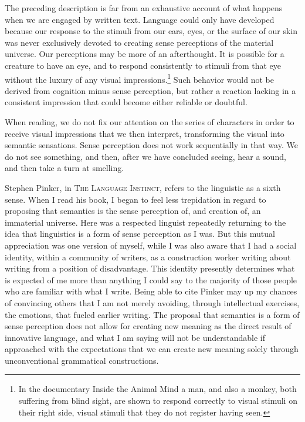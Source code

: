\documentclass[
]{memoir}
\begin{document}
The preceding description is far from an exhaustive account of what
happens when we are engaged by written text. Language could only have
developed because our response to the stimuli from our ears, eyes, or
the surface of our skin was never exclusively devoted to creating sense
perceptions of the material universe. Our perceptions may be more of an
afterthought. It is possible for a creature to have an eye, and to
respond consistently to stimuli from that eye without the luxury of any
visual impressions.\footnote{In the documentary Inside the Animal Mind a
  man, and also a monkey, both suffering from blind sight, are shown to
  respond correctly to visual stimuli on their right side, visual
  stimuli that they do not register having seen.} Such behavior would
not be derived from cognition minus sense perception, but rather a
reaction lacking in a consistent impression that could become either
reliable or doubtful.

When reading, we do not fix our attention on the series of characters in
order to receive visual impressions that we then interpret, transforming
the visual into semantic sensations. Sense perception does not work
sequentially in that way. We do not see something, and then, after we
have concluded seeing, hear a sound, and then take a turn at smelling.

Stephen Pinker, in \textsc{The Language Instinct}, refers to the
linguistic as a sixth sense. When I read his book, I began to feel less
trepidation in regard to proposing that semantics is the sense
perception of, and creation of, an immaterial universe. Here was a
respected linguist repeatedly returning to the idea that linguistics is
a form of sense perception as I was. But this mutual appreciation was
one version of myself, while I was also aware that I had a social
identity, within a community of writers, as a construction worker
writing about writing from a position of disadvantage. This identity
presently determines what is expected of me more than anything I could
say to the majority of those people who are familiar with what I write.
Being able to cite Pinker may up my chances of convincing others that I
am not merely avoiding, through intellectual exercises, the emotions,
that fueled earlier writing. The proposal that semantics is a form of
sense perception does not allow for creating new meaning as the direct
result of innovative language, and what I am saying will not be
understandable if approached with the expectations that we can create
new meaning solely through unconventional grammatical constructions.
\end{document}
